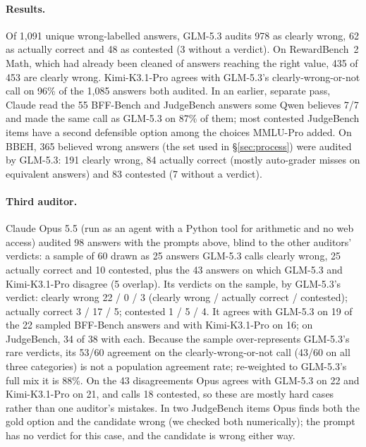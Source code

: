 \documentclass[11pt]{article}
\begin{document}
\paragraph{Results.} Of 1,091 unique wrong-labelled answers, GLM-5.3 audits 978 as clearly wrong, 62 as actually
correct and 48 as contested (3 without a verdict). On RewardBench~2 Math, which had already been cleaned of answers
reaching the right value, 435 of 453 are clearly wrong. Kimi-K3.1-Pro agrees with GLM-5.3's clearly-wrong-or-not
call on 96\% of the 1,085 answers both audited. In an earlier, separate pass, Claude read the 55 BFF-Bench and
JudgeBench answers some Qwen believes 7/7 and made the same call as GLM-5.3 on 87\% of them; most contested
JudgeBench items have a second defensible option among the choices MMLU-Pro added. On BBEH, 365 believed wrong
answers (the set used in \S\ref{sec:process}) were audited by GLM-5.3: 191 clearly wrong, 84 actually correct (mostly
auto-grader misses on equivalent answers) and 83 contested (7 without a verdict).

\paragraph{Third auditor.} Claude Opus 5.5 (run as an agent with a Python tool for arithmetic and no web access)
audited 98 answers with the prompts above, blind to the other auditors' verdicts: a sample of 60 drawn as 25 answers
GLM-5.3 calls clearly wrong, 25 actually correct and 10 contested, plus the 43 answers on which GLM-5.3 and
Kimi-K3.1-Pro disagree (5 overlap). Its verdicts on the sample, by GLM-5.3's verdict:
clearly wrong 22 / 0 / 3 (clearly wrong / actually correct / contested); actually correct 3 / 17 / 5; contested
1 / 5 / 4. It agrees with GLM-5.3 on 19 of the 22 sampled BFF-Bench answers and with Kimi-K3.1-Pro on 16; on
JudgeBench, 34 of 38 with each. Because the sample over-represents GLM-5.3's rare verdicts, its 53/60 agreement on the clearly-wrong-or-not call (43/60 on all three categories) is not a
population agreement rate; re-weighted to GLM-5.3's full mix it is 88\%. On the 43 disagreements Opus agrees with
GLM-5.3 on 22 and Kimi-K3.1-Pro on 21, and calls 18 contested, so these are mostly hard cases rather than one
auditor's mistakes. In two JudgeBench items Opus finds both the gold option and the candidate wrong (we checked both
numerically); the prompt has no verdict for this case, and the candidate is wrong either way.
\end{document}
